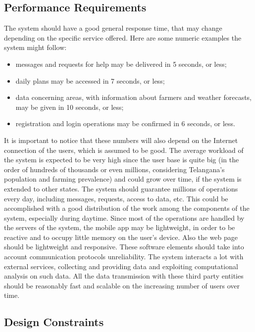\subsection{Performance Requirements}
\label{sec:per_req}
The system should have a good general response time, that may change depending on the specific service offered. Here are some numeric examples the system might follow:
\begin{itemize}
    \item messages and requests for help may be delivered in 5 seconds, or less;
    \item daily plans may be accessed in 7 seconds, or less;
    \item data concerning areas, with information about farmers and weather forecasts, may be given in 10 seconds, or less;
    \item registration and login operations may be confirmed in 6 seconds, or less.
\end{itemize}
It is important to notice that these numbers will also depend on the Internet connection of the users, which is assumed to be good.
\newline
\newline
The average workload of the system is expected to be very high since the user base is quite big (in the order of hundreds of thousands or even millions, considering Telangana’s population and farming prevalence) and could grow over time, if the system is extended to other states. The system should guarantee millions of operations every day, including messages, requests, access to data, etc. This could be accomplished with a good distribution of the work among the components of the system, especially during daytime. 
\newline
\newline
Since most of the operations are handled by the servers of the system, the mobile app may be lightweight, in order to be reactive and to occupy little memory on the user’s device. Also the web page should be lightweight and responsive. These software elements should take into account communication protocols unreliability.
\newline
\newline
The system interacts a lot with external services, collecting and providing data and exploiting computational analysis on such data. All the data transmission with these third party entities should be reasonably fast and scalable on the increasing number of users over time.


\subsection{Design Constraints}
\label{sec:design_constraints}


